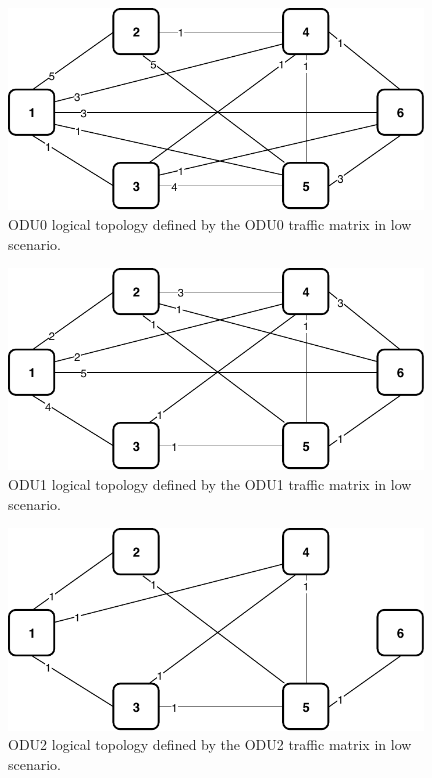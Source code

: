 \begin{figure}[h!]
\centering
\includegraphics[width=11cm]{sdf/ilp/opaque_survivability/figures/logical_topology_ODU0_low}
\caption{ODU0 logical topology defined by the ODU0 traffic matrix in low scenario.}
\label{logical_ODU0_low}
\end{figure}
\newpage
\begin{figure}[h!]
\centering
\includegraphics[width=11cm]{sdf/ilp/opaque_survivability/figures/logical_topology_ODU1_low}
\caption{ODU1 logical topology defined by the ODU1 traffic matrix in low scenario.}
\label{logical_ODU1_low}
\end{figure}
\vspace{13pt}
\begin{figure}[h!]
\centering
\includegraphics[width=11cm]{sdf/ilp/opaque_survivability/figures/logical_topology_ODU2_low}
\caption{ODU2 logical topology defined by the ODU2 traffic matrix in low scenario.}
\label{logical_ODU2_low}
\end{figure}
